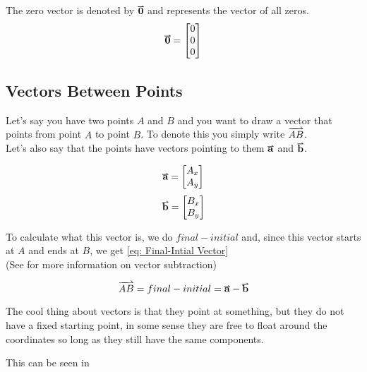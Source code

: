 \documentclass[main.tex]{subfiles}
\begin{document}
                The zero vector is denoted by $\vect{0}$ and represents the vector of all zeros.
                \begin{equation}
                    \vect{0} = \Matrix{0\\0\\0}
                \end{equation}



            \subsection{Vectors Between Points}
                \label{subsec: Vectors Between Points}

                Let's say you have two points $A$ and $B$ and you want to draw a vector that points from point $A$ to point $B$. To denote this you simply write $\lhvec{AB}$.\\
                Let's also say that the points have vectors pointing to them $\vect{a}$ and $\vect{b}$.

                \begin{equation*}
                    \vect{a} = \Matrix{A_x\\A_y}
                \end{equation*}
                \begin{equation*}
                    \vect{b} = \Matrix{B_x\\B_y}
                \end{equation*}

                To calculate what this vector is, we do $final - initial$ and, since this vector starts at $A$ and ends at $B$, we get \eqref{eq: Final-Intial Vector}\\
                (See  for more information on vector subtraction)

                \begin{equation}
                    \lhvec{AB} = final - initial = \vect{a} - \vect{b}
                    \label{eq: Final-Intial Vector}
                \end{equation}

                The cool thing about vectors is that they point at something, but they do not have a fixed starting point, in some sense they are free to float around the coordinates so long as they still have the same components.

                This can be seen in 
\end{document}
